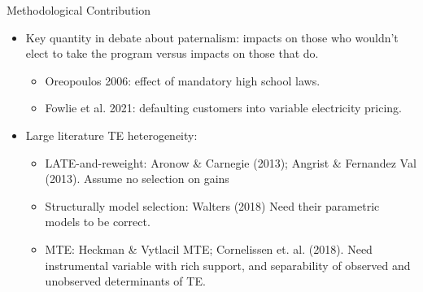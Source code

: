 \documentclass[8pt]{beamer}
\begin{document}
\begin{frame}{Methodological Contribution}
\begin{itemize}
 
   \vfill   \item Key quantity in debate about paternalism:  impacts on those who wouldn't elect to take the program versus impacts on those that do.   \begin{itemize}
       \item Oreopoulos 2006: effect of mandatory high school laws.
       \item Fowlie et al. 2021: defaulting customers into variable electricity pricing.
   \end{itemize} 
   
   
   
   
    

    
    


    \vfill \item  Large literature TE heterogeneity: \begin{itemize}
        \item LATE-and-reweight:  Aronow \& Carnegie (2013); Angrist \& Fernandez Val (2013). \alert{Assume no selection on gains}
        \item Structurally model selection:  Walters (2018) \alert{Need their parametric models to be correct}.
        \item MTE: Heckman \& Vytlacil MTE; Cornelissen et. al. (2018). \alert{Need instrumental variable with rich support, and separability of observed and unobserved determinants of TE.}
    \end{itemize}


\end{itemize}
\end{frame}
\end{document}
